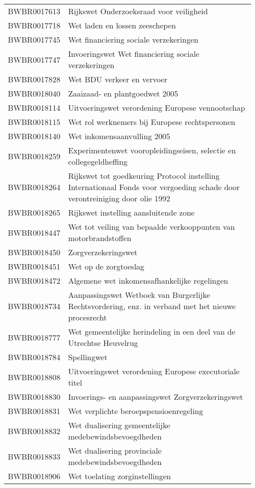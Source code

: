 \begin{longtable}{lp{}}
BWBR0017613 & Rijkswet Onderzoeksraad voor veiligheid \\
BWBR0017718 & Wet laden en lossen zeeschepen \\
BWBR0017745 & Wet financiering sociale verzekeringen  \\
BWBR0017747 & Invoeringswet Wet financiering sociale verzekeringen \\
BWBR0017828 & Wet BDU verkeer en vervoer  \\
BWBR0018040 & Zaaizaad- en plantgoedwet 2005  \\
BWBR0018114 & Uitvoeringswet verordening Europese vennootschap  \\
BWBR0018115 & Wet rol werknemers bij Europese rechtspersonen \\
BWBR0018140 & Wet inkomensaanvulling 2005 \\
BWBR0018259 & Experimentenwet vooropleidingseisen, selectie en collegegeldheffing  \\
BWBR0018264 & Rijkswet tot goedkeuring Protocol instelling Internationaal Fonds voor vergoeding schade door verontreiniging door olie 1992 \\
BWBR0018265 & Rijkswet instelling aansluitende zone \\
BWBR0018447 & Wet tot veiling van bepaalde verkooppunten van motorbrandstoffen \\
BWBR0018450 & Zorgverzekeringswet \\
BWBR0018451 & Wet op de zorgtoeslag  \\
BWBR0018472 & Algemene wet inkomensafhankelijke regelingen \\
BWBR0018734 & Aanpassingswet Wetboek van Burgerlijke Rechtsvordering, enz. in verband met het nieuwe procesrecht \\
BWBR0018777 & Wet gemeentelijke herindeling in een deel van de Utrechtse Heuvelrug \\
BWBR0018784 & Spellingwet  \\
BWBR0018808 & Uitvoeringswet verordening Europese executoriale titel \\
BWBR0018830 & Invoerings- en aanpassingswet Zorgverzekeringswet \\
BWBR0018831 & Wet verplichte beroepspensioenregeling  \\
BWBR0018832 & Wet dualisering gemeentelijke medebewindsbevoegdheden \\
BWBR0018833 & Wet dualisering provinciale medebewindsbevoegdheden \\
BWBR0018906 & Wet toelating zorginstellingen  \\

\end{longtable}
